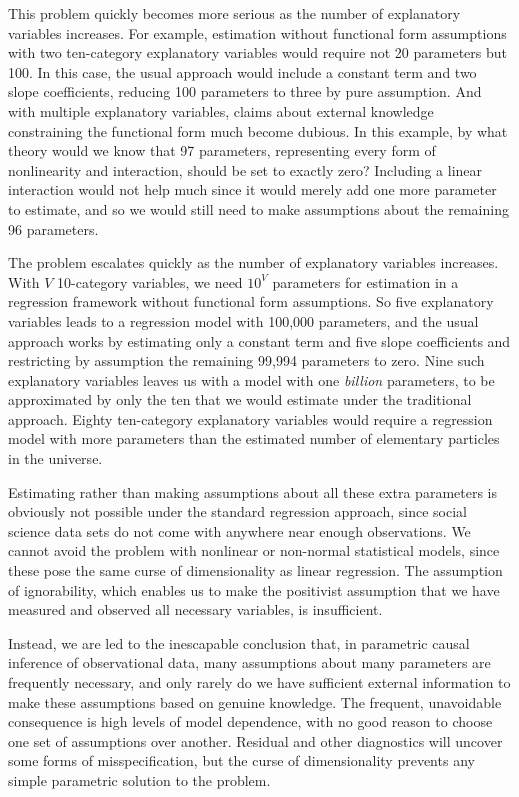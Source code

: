 \documentclass[11pt,titlepage]{article}
\begin{document}
This problem quickly becomes more serious as the number of explanatory
variables increases.  For example, estimation without functional form
assumptions with two ten-category explanatory variables would require
not 20 parameters but 100.  In this case, the usual approach would
include a constant term and two slope coefficients, reducing 100
parameters to three by pure assumption.  And with multiple explanatory
variables, claims about external knowledge constraining the functional
form much become dubious.  In this example, by what theory would we
know that 97 parameters, representing every form of nonlinearity and
interaction, should be set to exactly zero?  Including a linear
interaction would not help much since it would merely add one more
parameter to estimate, and so we would still need to make assumptions
about the remaining 96 parameters.

The problem escalates quickly as the number of explanatory variables
increases.  With $V$ 10-category variables, we need $10^V$ parameters
for estimation in a regression framework without functional form
assumptions.  So five explanatory variables leads to a regression
model with 100,000 parameters, and the usual approach works by
estimating only a constant term and five slope coefficients and
restricting by assumption the remaining 99,994 parameters to zero.
Nine such explanatory variables leaves us with a model with one
\emph{billion} parameters, to be approximated by only the ten that we
would estimate under the traditional approach.  Eighty ten-category
explanatory variables would require a regression model with more
parameters than the estimated number of elementary particles in the
universe.

Estimating rather than making assumptions about all these extra
parameters is obviously not possible under the standard regression
approach, since social science data sets do not come with anywhere
near enough observations.  We cannot avoid the problem with nonlinear
or non-normal statistical models, since these pose the same curse of
dimensionality as linear regression.  The assumption of ignorability,
which enables us to make the positivist assumption that we have
measured and observed all necessary variables, is insufficient.

Instead, we are led to the inescapable conclusion that, in parametric
causal inference of observational data, many assumptions about many
parameters are frequently necessary, and only rarely do we have
sufficient external information to make these assumptions based on
genuine knowledge.  The frequent, unavoidable consequence is high
levels of model dependence, with no good reason to choose one set of
assumptions over another.  Residual and other diagnostics will uncover
some forms of misspecification, but the curse of dimensionality
prevents any simple parametric solution to the problem.
\end{document}
